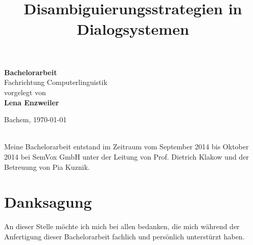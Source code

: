 \documentclass[12pt,a4paper]{scrartcl}
\title{$\,$\\  Disambiguierungsstrategien in Dialogsystemen}
\date{}
\author{}
\begin{document}

\maketitle
\sffamily
\begin{center}
\huge
\textbf{Bachelorarbeit}\\
\vfill
\LARGE
Fachrichtung Computerlinguistik\\
\vfill
\normalsize
vorgelegt von\\
\Large
\textbf{Lena Enzweiler}\\
\vfill


\normalsize
Bachem,
\today

\end{center}

\thispagestyle{empty}
\rmfamily
\cleardoublepage
$\,$\\
\vfill
Meine Bachelorarbeit entstand im Zeitraum vom September 2014 bis Oktober 2014 bei SemVox GmbH unter der Leitung von Prof. Dietrich Klakow und der Betreuung von Pia Kuznik.


\cleardoublepage

\section*{Danksagung}
An dieser Stelle möchte ich mich bei allen bedanken, die mich während der Anfertigung dieser Bachelorarbeit fachlich und persönlich unterstürzt haben.\\
\end{document}
